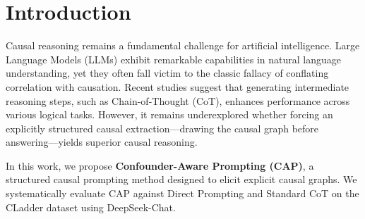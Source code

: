 \documentclass{article}
\theoremstyle{plain}
\theoremstyle{definition}
\theoremstyle{remark}
\begin{document}
\printAffiliationsAndNotice{}  %

\begin{abstract}
Large Language Models (LLMs) often struggle to distinguish genuine causal relationships from mere correlations. In this paper, we evaluate whether guiding LLMs to explicitly construct structured causal models---specifically identifying confounders and causal pathways---improves their causal reasoning capabilities. We propose Confounder-Aware Prompting (CAP), a three-stage prompting pipeline comprising Pathway Analysis, Confounder Identification, and Deconfounded Judgment. Evaluating on the CLadder benchmark using DeepSeek-Chat, we find that while Direct Prompting yields a poor accuracy of 58.65\%, both Standard Chain-of-Thought (CoT) (92.48\%) and CAP (91.23\%) significantly improve performance. Although CAP does not statistically outperform standard CoT in overall accuracy, it achieves high interpretability with a 78.45\% confounder identification rate. Our findings suggest that while structural prompting aids in surfacing explicit causal graphs, standard CoT effectively saturates zero-shot causal reasoning capabilities on existing standard benchmarks.
\end{abstract}

\section{Introduction}

Causal reasoning remains a fundamental challenge for artificial intelligence. Large Language Models (LLMs) exhibit remarkable capabilities in natural language understanding, yet they often fall victim to the classic fallacy of conflating correlation with causation. Recent studies suggest that generating intermediate reasoning steps, such as Chain-of-Thought (CoT), enhances performance across various logical tasks. However, it remains underexplored whether forcing an explicitly structured causal extraction---drawing the causal graph before answering---yields superior causal reasoning.

In this work, we propose \textbf{Confounder-Aware Prompting (CAP)}, a structured causal prompting method designed to elicit explicit causal graphs. We systematically evaluate CAP against Direct Prompting and Standard CoT on the CLadder dataset using DeepSeek-Chat. 
\end{document}
